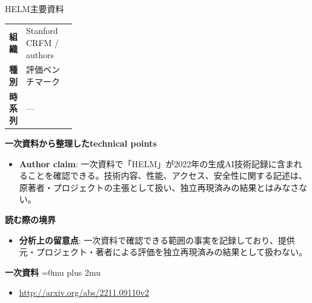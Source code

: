 \begin{technicalnote}{HELM}{主要資料}
\begingroup
\begin{tabularx}{\linewidth}{@{}>{\bfseries}p{0.22\linewidth}X@{}}
組織 & Stanford CRFM / authors \\
種別 & 評価ベンチマーク \\
時系列 & — \\
\end{tabularx}
\smallskip
{\bfseries 一次資料から整理したtechnical points}
\begin{itemize}[leftmargin=1.5em,itemsep=0.35em]
\item \textbf{Author claim}: 一次資料で「HELM」が2022年の生成AI技術記録に含まれることを確認できる。技術内容、性能、アクセス、安全性に関する記述は、原著者・プロジェクトの主張として扱い、独立再現済みの結果とはみなさない。
\end{itemize}
\begin{minipage}{\linewidth}
{\bfseries 読む際の境界}
\begin{itemize}[leftmargin=1.5em,itemsep=0.35em]
\item \textbf{分析上の留意点}: 一次資料で確認できる範囲の事実を記録しており、提供元・プロジェクト・著者による評価を独立再現済みの結果として扱わない。
\end{itemize}
\begin{samepage}
{\bfseries 一次資料}
\begingroup\sloppy
\Urlmuskip=0mu plus 2mu\relax
\begin{itemize}[leftmargin=1.5em,itemsep=0.25em]
\item {\scriptsize\url{http://arxiv.org/abs/2211.09110v2}}
\end{itemize}
\endgroup
\end{samepage}
\end{minipage}
\endgroup
\end{technicalnote}
\medskip

